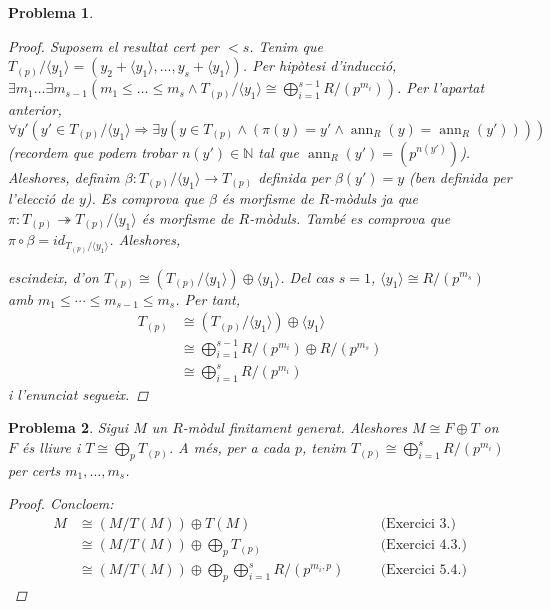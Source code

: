 \documentclass[compress]{article}
\newtheorem{problema}{Problema}
\theoremstyle{definition}
\DeclareMathOperator{\ann}{ann}
\begin{document}
\begin{problema}
\begin{enumerate}
\begin{proof}
            Suposem el resultat cert per $<s$. Tenim que $T_{(p)}/\langle y_{1}\rangle=(y_{2}+\langle y_{1}\rangle,\ldots,y_{s}+\langle y_{1}\rangle)$. Per hipòtesi d'inducció, $\exists m_{1}\ldots\exists m_{s-1}(m_{1}\leq\ldots\leq m_{s}\land T_{(p)}/\langle y_{1}\rangle\cong\bigoplus_{i=1}^{s-1}R/(p^{m_{i}}))$. Per l'apartat anterior, $\forall y'(y'\in T_{(p)}/\langle y_{1}\rangle\Rightarrow\exists y(y\in T_{(p)}\land(\pi(y)=y'\land\ann_{R}(y)=\ann_{R}(y'))))$ (recordem que podem trobar $n(y')\in\mathbb{N}$ tal que $\ann_{R}(y')=(p^{n(y')})$). Aleshores, definim $\beta:T_{(p)}/\langle y_{1}\rangle\rightarrow T_{(p)}$ definida per $\beta(y')=y$ (ben definida per l'elecció de $y$). Es comprova que $\beta$ és morfisme de $R$-mòduls ja que $\pi:T_{(p)}\twoheadrightarrow T_{(p)}/\langle y_{1}\rangle$ és morfisme de $R$-mòduls. També es comprova que $\pi\circ\beta=id_{T_{(p)}/\langle y_{1}\rangle}$. Aleshores,
            \begin{center}
            \end{center}
            escindeix, d'on $T_{(p)}\cong(T_{(p)}/\langle y_{1}\rangle)\oplus\langle y_{1}\rangle$. Del cas $s=1$, $\langle y_{1}\rangle\cong R/(p^{m_{s}})$ amb $m_{1}\leq\cdots\leq m_{s-1}\leq m_{s}$. Per tant,
            \begin{align*}
                T_{(p)}
                &\cong(T_{(p)}/\langle y_{1}\rangle)\oplus\langle y_{1}\rangle\\
                &\cong\bigoplus_{i=1}^{s-1}R/(p^{m_{i}})\oplus R/(p^{m_{s}})\\
                &\cong\bigoplus_{i=1}^{s}R/(p^{m_{i}})
            \end{align*}
            i l'enunciat segueix.
        \end{proof}
    \end{enumerate}
\end{problema}
\begin{problema}
    Sigui $M$ un $R$-mòdul finitament generat. Aleshores $M\cong F\oplus T$ on $F$ és lliure i $T\cong\bigoplus_{p}T_{(p)}$. A més, per a cada $p$, tenim $T_{(p)}\cong\bigoplus_{i=1}^{s}R/(p^{m_{i}})$ per certs $m_{1},\ldots,m_{s}$.
    \begin{proof}
        Concloem:
        \begin{align*}
            M
            &\cong(M/T(M))\oplus T(M)
            &\quad&\textrm{(Exercici 3.)}\\
            &\cong(M/T(M))\oplus\bigoplus_{p}T_{(p)}
            &\quad&\textrm{(Exercici 4.3.)}\\
            &\cong(M/T(M))\oplus\bigoplus_{p}\bigoplus_{i=1}^{s}R/(p^{m_{i},p})
            &\quad&\textrm{(Exercici 5.4.)}
        \end{align*}
    \end{proof}
\end{problema}
\end{document}
